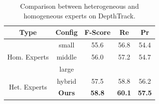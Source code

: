 \begin{table}[ht]
\caption{Comparison between heterogeneous and homogeneous experts on DepthTrack.}
\label{tab:ablation_moe}
\centering
\small
\begin{tabular}{cc|ccc}
\toprule
Type & Config & F-Score & Re & Pr \\
\midrule
\multirow{3}{*}{Hom. Experts} & small & 55.6 & 56.8 & 54.4 \\
 & middle & 56.0 & 57.2 & 54.7 \\
 & large &  &  &  \\
\midrule
\multirow{2}{*}{Het. Experts} & hybrid & 57.5 & 58.8 & 56.2 \\
& \textbf{Ours} & \textbf{58.8} & \textbf{60.1} & \textbf{57.5} \\
\bottomrule
\end{tabular}
\end{table}
